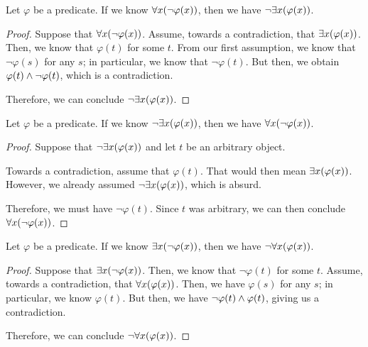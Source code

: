 \begin{lemma}\label{lem:forall}
    Let \(\varphi\) be a predicate.
    If we know \(\forall x \pn*{\neg \varphi(x)}\), then we have \(\neg \exists x \pn*{\varphi(x)}\).
\end{lemma}
\begin{proof}
    Suppose that \(\forall x \pn*{\neg \varphi(x)}\).
    Assume, towards a contradiction, that \(\exists x \pn*{\varphi(x)}\).
    Then, we know that \(\varphi(t)\) for some \(t\).
    From our first assumption, we know that \(\neg \varphi(s)\) for any \(s\);
    in particular, we know that \(\neg \varphi(t)\).
    But then, we obtain \(\varphi(t) \wedge \neg \varphi(t)\), which is a contradiction. \contradiction

    Therefore, we can conclude \(\neg \exists x \pn*{\varphi(x)}\).
\end{proof}

\begin{lemma}\label{lem:negexists}
    Let \(\varphi\) be a predicate.
    If we know \(\neg \exists x \pn*{\varphi(x)}\), then we have \(\forall x \pn*{\neg \varphi(x)}\).
\end{lemma}
\begin{proof}
    Suppose that \(\neg \exists x \pn*{\varphi(x)}\) and let \(t\) be an arbitrary object.

    Towards a contradiction, assume that \(\varphi(t)\).
    That would then mean \(\exists x \pn*{\varphi(x)}\).
    However, we already assumed \(\neg \exists x \pn*{\varphi(x)}\), which is absurd. \contradiction

    Therefore, we must have \(\neg \varphi(t)\).
    Since \(t\) was arbitrary, we can then conclude \(\forall x \pn*{\neg \varphi(x)}\).
\end{proof}

\begin{lemma}\label{lem:exists}
    Let \(\varphi\) be a predicate.
    If we know \(\exists x \pn*{\neg \varphi(x)}\), then we have \(\neg \forall x \pn*{\varphi(x)}\).
\end{lemma}
\begin{proof}
    Suppose that \(\exists x \pn*{\neg \varphi(x)}\).
    Then, we know that \(\neg \varphi(t)\) for some \(t\).
    Assume, towards a contradiction, that \(\forall x \pn*{\varphi(x)}\).
    Then, we have \(\varphi(s)\) for any \(s\);
    in particular, we know \(\varphi(t)\).
    But then, we have \(\neg \varphi(t) \wedge \varphi(t)\), giving us a contradiction. \contradiction

    Therefore, we can conclude \(\neg \forall x \pn*{\varphi(x)}\).
\end{proof}

